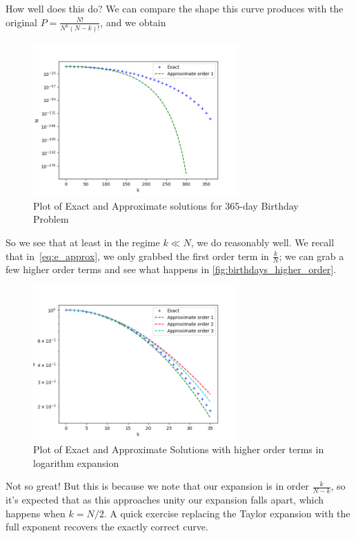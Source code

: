\documentclass[12pt]{report}
\begin{document}
How well does this do? We can compare the shape this curve produces with the
original $P = \frac{N!}{N^k(N-k)!}$, and we obtain
\begin{figure}[!h]
    \centering
    \includegraphics[width=0.7\textwidth]{birthdays/birthdays_approx.png}
    \caption{Plot of Exact and Approximate solutions for 365-day Birthday
        Problem\label{fig:birthdays}}
\end{figure}

So we see that at least in the regime $k \ll N$, we do reasonably well. We
recall that in~\eqref{eq:e_approx}, we only grabbed the first order term in
$\frac{k}{N}$; we can grab a few higher order terms and see what happens in
\autoref{fig:birthdays_higher_order}.
\begin{figure}[!h]
    \centering
    \includegraphics[width=0.7\textwidth]{birthdays/birthdays_approxorder_3.png}
    \caption{Plot of Exact and Approximate Solutions with higher order terms in
        logarithm expansion\label{fig:birthdays_higher_order}}
\end{figure}

Not so great! But this is because we note that our expansion is in order
$\frac{k}{N - k}$, so it's expected that as this approaches unity our expansion
falls apart, which happens when $k = N/2$. A quick exercise replacing the Taylor
expansion with the full exponent recovers the exactly correct curve.
\end{document}
